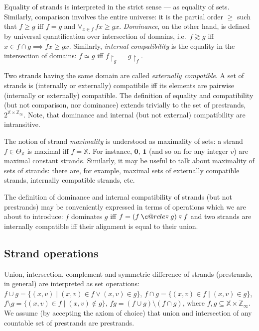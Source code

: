 \documentclass [a4paper,12pt] {article}
\makeatletter
\theoremstyle{definition}
\newcommand{\symdiff}{}
\DeclareRobustCommand{\symdiff}{\mathbin{\triangle}}
\newcommand{\domain}{}
\DeclareRobustCommand{\domain}{\mathop{\textstyle\mathsmaller{\bf {Dom}}}}
\newcommand\c@rcle[2]{\mathbin{\ooalign{\hidewidth$#1#2$\hidewidth\crcr$#1\ocircle$}}}
\newcommand{\wxp}{\mathbin{\mathpalette\c@rcle{\raisebox{0.035em}{$\mathsmaller{\triangledown}$}}}}
\newcommand{\nxp}{\mathbin{\raisebox{0.035em}{$\mathsmaller{\triangledown}$}}}
\makeatother
\begin{document}
Equality of strands is interpreted in the strict sense --- as equality
of sets.  Similarly, comparison involves the entire universe: it is
the partial order $\geq$ such that $f \geq g$ iff $\domain{f} =
\domain{g}$ and $\forall_{x \in \domain{f}}\,fx \geq gx$. {\em
  Dominance}\/, on the other hand, is defined by universal
quantification over intersection of domains, i.e.\ $f \apprge g$ iff
$x \in \domain{f} \cap \domain{g} \implies fx \geq gx$.  Similarly,
{\em internal compatibility}\/ is the equality in the intersection of
domains: $f \simeq g$ iff $f{\restriction}_{\domain{g}} =
g{\restriction}_{\domain{f}}$.

Two strands having the same domain are called {\em externally
  compatible}\/.  A set of strands is (internally or externally)
compatibile iff its elements are pairwise (internally or externally)
compatible.  The definition of equality and compatibility (but not
comparison, nor dominance) extends trivially to the set of prestrands,
$2^{{\mathbb X} \times {\mathbb Z}_\infty}$.  Note, that dominance and
internal (but not external) compatibility are intransitive.

The notion of strand {\em maximality}\/ is understood as maximality of
sets: a strand $f \in \Theta_{\mathbb X}$ is maximal iff $\domain{f} =
{\mathbb X}$.  For instance, $\bm{0}$, $\bm{1}$ (and so on for any
integer $v$) are maximal constant strands.  Similarly, it may be
useful to talk about maximality of sets of strands: there are, for
example, maximal sets of externally compatible strands, internally
compatible strands, etc.

The definition of dominance and internal compatibility of strands (but
not prestrands) may be conveniently expressed in terms of operations
which we are about to introduce: $f$ dominates $g$ iff $f = (f \wxp g)
\nxp f$ and two strands are internally compatible iff their alignment
is equal to their union.

\subsection {Strand operations}

Union, intersection, complement and symmetric difference of strands
(prestrands, in general) are interpreted as set operations: $f \cup g
= \{(x, v) \;|\; (x, v) \in f \vee (x, v) \in g\}$, $f \cap g = \{(x,
v) \in f \;|\; (x, v) \in g\}$, $f \setminus g = \{(x, v) \in f \;|\;
(x, v) \not\in g\}$, $f \symdiff g = (f \cup g) \setminus (f \cap g)$,
where $f, g \subseteq {\mathbb X}\times{\mathbb Z}_\infty$.  We assume
(by accepting the axiom of choice) that union and intersection of any
countable set of prestrands are prestrands.
\end{document}
